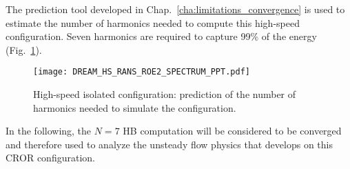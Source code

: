 

The prediction tool developed in Chap.~\ref{cha:limitations_convergence}
is used to estimate the number of harmonics needed to compute
this high-speed configuration.
Seven harmonics are required to capture 99\% of the energy
(Fig.~\ref{fig:DREAM_HS_RANS_ROE2_SPECTRUM_PPT}).
\begin{figure}[htp]
  \centering
  \texttt{[image: DREAM\_HS\_RANS\_ROE2\_SPECTRUM\_PPT.pdf]}
  \caption{High-speed isolated configuration: prediction of the number
  of harmonics needed to simulate the configuration.}
  \label{fig:DREAM_HS_RANS_ROE2_SPECTRUM_PPT}
\end{figure}

In the following, the $N=7$ HB computation will be
considered to be converged and therefore used to 
analyze the unsteady flow physics that develops on 
this CROR configuration.
